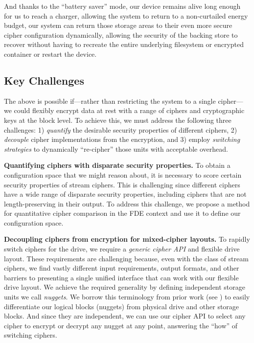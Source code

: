 And thanks to the ``battery saver'' mode, our device remains alive long enough
for us to reach a charger, allowing the system to return to a non-curtailed
energy budget, our system can return those storage areas to their even more
secure cipher configuration dynamically, allowing the security of the backing
store to recover without having to recreate the entire underlying filesystem or
encrypted container or restart the device.

\subsection{Key Challenges}

The above is possible if---rather than restricting the system to a single
cipher---we could flexibly encrypt data at rest with a range of ciphers and
cryptographic keys at the block level. To achieve this, we must address the
following three challenges: 1) \emph{quantify} the desirable security properties
of different ciphers, 2) \emph{decouple} cipher implementations from the
encryption, and 3) employ \emph{switching strategies} to dynamically
``re-cipher'' those units with acceptable overhead.

\textbf{Quantifying ciphers with disparate security properties.} To obtain a
configuration space that we might reason about, it is necessary to score certain
security properties of stream ciphers. This is challenging since different
ciphers have a wide range of disparate security properties, including ciphers
that are not length-preserving in their output. To address this challenge, we
propose a method for quantitative cipher comparison in the FDE context and use
it to define our configuration space.

\textbf{Decoupling ciphers from encryption for mixed-cipher layouts.} To rapidly
switch ciphers for the drive, we require a \emph{generic cipher API} and
flexible drive layout. These requirements are challenging because, even with the
class of stream ciphers, we find vastly different input requirements, output
formats, and other barriers to presenting a single unified interface that can
work with our flexible drive layout. We achieve the required generality by
defining independent storage units we call \emph{nuggets}. We borrow this
terminology from prior work (see \cite{StrongBox}) to easily differentiate our
logical blocks (nuggets) from physical drive and other storage blocks. And since
they are independent, we can use our cipher API to select any cipher to encrypt
or decrypt any nugget at any point, answering the ``how'' of switching ciphers.


